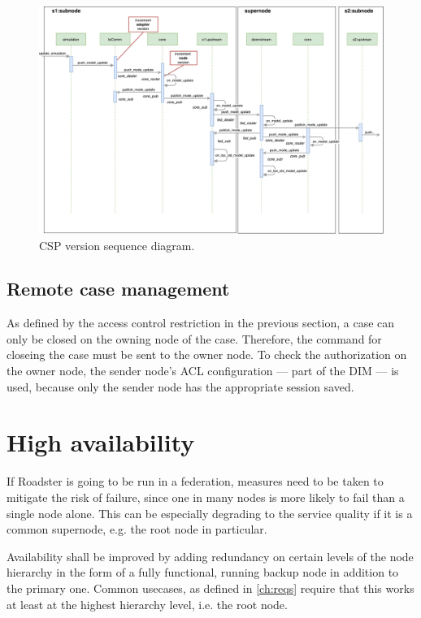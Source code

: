 \begin{figure}[]
	\includegraphics[width=\textwidth]{img/sequence_diagram_model_update_pub.pdf}
	\caption{CSP version sequence diagram.}
	\label{fig:csp:version-sequence}
\end{figure}




\subsection{Remote case management}
As defined by the access control restriction in the previous section, a case
can only be closed on the owning node of the case. Therefore, the command
for closeing the case must be sent to the owner node. To check the authorization
on the owner node, the sender node's ACL configuration --- part of the DIM --- is used, because only
the sender node has the appropriate session saved.


\section{High availability}\label{sec:approach:ha}
If Roadster is going to be run in a federation, measures need to be taken to
mitigate the risk of failure, since one in many nodes is more likely to fail than a
single node alone. This can be especially degrading to the service quality if
it is a common supernode, e.g. the root node in particular.

Availability shall be improved by adding redundancy on certain levels of the
node hierarchy in the form of a fully functional, running backup node in
addition to the primary one. Common usecases, as defined in \autoref{ch:reqs}
require that this works at least at the highest hierarchy level, i.e. the root
node.

